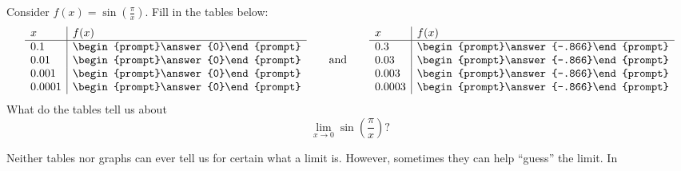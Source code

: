 \documentclass{ximera}
\begin{document}
\begin{question}
  Consider $f(x) = \sin\left(\frac{\pi}{x}\right)$. Fill in the 
  tables below:
  \[
  \begin{array}{l|l}
    x      & f(x)      \\ \hline
    0.1    & \begin{prompt}\answer{0}\end{prompt}\\
    0.01   & \begin{prompt}\answer{0}\end{prompt}\\
    0.001  & \begin{prompt}\answer{0}\end{prompt}\\
    0.0001 & \begin{prompt}\answer{0}\end{prompt} 
  \end{array}
  \qquad\text{and}\qquad
  \begin{array}{l|l}
    x      & f(x)            \\ \hline
    0.3    &  \begin{prompt}\answer{-.866}\end{prompt} \\
    0.03   &  \begin{prompt}\answer{-.866}\end{prompt} \\
    0.003  &  \begin{prompt}\answer{-.866}\end{prompt} \\
    0.0003 &  \begin{prompt}\answer{-.866}\end{prompt}
  \end{array}
  \]
  What do the tables tell us about
  \[
  \lim_{x\to 0}\sin\left(\frac{\pi}{x}\right)?
  \]
  \begin{multipleChoice}
  \end{multipleChoice}
  \begin{feedback}
    Neither tables nor graphs can ever tell us for certain what a
    limit is. However, sometimes they can help ``guess'' the limit. In

\end{feedback}
\end{question}
\end{document}
